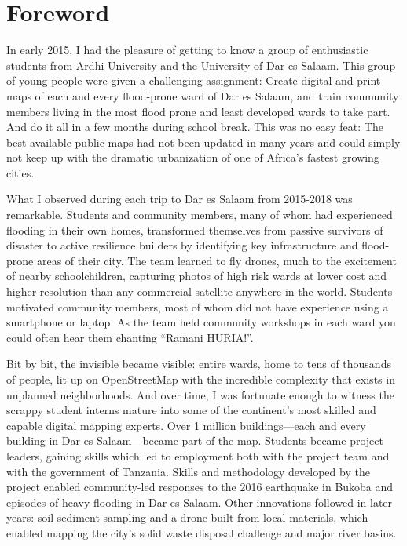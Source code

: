 \documentclass[a4paper,12pt,twoside]{article}
\begin{document}
\section{Foreword}
\begin{multicols}{2}
In early 2015, I had the pleasure of getting to know a group of enthusiastic students from Ardhi University and the University of Dar es Salaam. This group of young people were given a challenging assignment: Create digital and print maps of each and every flood-prone ward of Dar es Salaam, and train community members living in the most flood prone and least developed wards to take part. And do it all in a few months during school break. This was no easy feat: The best available public maps had not been updated in many years and could simply not keep up with the dramatic urbanization of one of Africa’s fastest growing cities.
 
What I observed during each trip to Dar es Salaam from 2015-2018 was remarkable. Students and community members, many of whom had experienced flooding in their own homes, transformed themselves from passive survivors of disaster to active resilience builders by identifying key infrastructure and flood-prone areas of their city. The team learned to fly drones, much to the excitement of nearby schoolchildren, capturing photos of high risk wards at lower cost and higher resolution than any commercial satellite anywhere in the world. Students motivated community members, most of whom did not have experience using a smartphone or laptop. As the team held community workshops in each ward you could often hear them chanting “Ramani HURIA!”.
 
Bit by bit, the invisible became visible: entire wards, home to tens of thousands of people, lit up on OpenStreetMap with the incredible complexity that exists in unplanned neighborhoods. And over time, I was fortunate enough to witness the scrappy student interns mature into some of the continent’s most skilled and capable digital mapping experts. Over 1 million buildings---each and every building in Dar es Salaam---became part of the map. Students became project leaders, gaining skills which led to employment both with the project team and with the government of Tanzania. Skills and methodology developed by the project enabled community-led responses to the 2016 earthquake in Bukoba and episodes of heavy flooding in Dar es Salaam. Other innovations followed in later years: soil sediment sampling and a drone built from local materials, which enabled mapping the city’s solid waste disposal challenge and major river basins.
 

\end{multicols}
\end{document}
